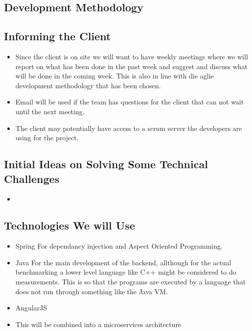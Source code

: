 \subsection{Development Methodology}


\subsection{Informing the Client}
\begin{itemize}
	\item Since the client is on site we will want to have weekly meetings where we will report on what has been done in the past week and suggest and discuss what will be done in the coming week. This is also in line with die aglie development methodology that has been chosen.
	\item Email will be used if the team has questions for the client that can not wait until the next meeting.
	\item The client may potentially have access to a scrum server the developers are using for the project.
\end{itemize}

\subsection{Initial Ideas on Solving Some Technical Challenges}
\begin{itemize}
	\item 
\end{itemize}

\subsection{Technologies We will Use}
\begin{itemize}
	\item Spring
	For dependancy injection and Aspect Oriented Programming.
	\item Java
	For the main development of the backend, allthough for the actual benchmarking a lower level language like C++ might be considered to do measurements. This is so that the programs are executed by a language that does not run through something like the Java VM.
	\item AngularJS
	\item This will be combined into a microservices architecture
\end{itemize} 

